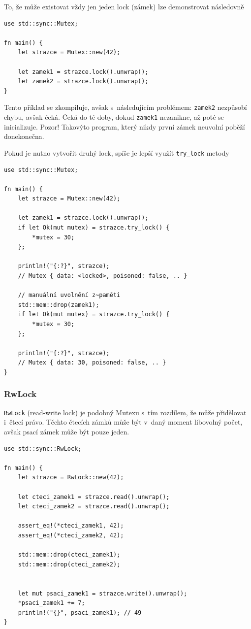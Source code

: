 \documentclass[a4paper, 12pt]{article} %
\newcommand{\rust}[1]{\texttt{#1}}
\begin{document}
            To, že může existovat vždy jen jeden lock (zámek) lze demonstrovat následovně
            \begin{verbatim}
use std::sync::Mutex;

fn main() {
    let strazce = Mutex::new(42);

    let zamek1 = strazce.lock().unwrap();
    let zamek2 = strazce.lock().unwrap();
}
            \end{verbatim}
            
            Tento příklad se zkompiluje, avšak s~následujícím problémem: \rust{zamek2} nezpůsobí chybu, avšak čeká. Čeká do té doby, dokud \rust{zamek1} nezanikne, až poté se inicializuje. Pozor! Takovýto program, který nikdy první zámek neuvolní poběží donekonečna.
            
            Pokud je nutno vytvořit druhý lock, spíše je lepší využít \rust{try_lock} metody
            \begin{verbatim}
use std::sync::Mutex;

fn main() {
    let strazce = Mutex::new(42);

    let zamek1 = strazce.lock().unwrap();
    if let Ok(mut mutex) = strazce.try_lock() {
        *mutex = 30;
    };

    println!("{:?}", strazce);
    // Mutex { data: <locked>, poisoned: false, .. }

    // manuální uvolnění z~paměti
    std::mem::drop(zamek1);
    if let Ok(mut mutex) = strazce.try_lock() {
        *mutex = 30;
    };

    println!("{:?}", strazce);
    // Mutex { data: 30, poisoned: false, .. }
}
            \end{verbatim}
            
            \subsubsection*{RwLock}
                \rust{RwLock} (read-write lock) je podobný Mutexu s~tím rozdílem, že může přidělovat i~čtecí právo. Těchto čtecích zámků může být v~daný moment libovolný počet, avšak psací zámek může být pouze jeden.
                \begin{verbatim}
use std::sync::RwLock;

fn main() {
    let strazce = RwLock::new(42);

    let cteci_zamek1 = strazce.read().unwrap();
    let cteci_zamek2 = strazce.read().unwrap();

    assert_eq!(*cteci_zamek1, 42);
    assert_eq!(*cteci_zamek2, 42);

    std::mem::drop(cteci_zamek1);
    std::mem::drop(cteci_zamek2);


    let mut psaci_zamek1 = strazce.write().unwrap();
    *psaci_zamek1 += 7;
    println!("{}", psaci_zamek1); // 49
}
                \end{verbatim}
                
\end{document}
